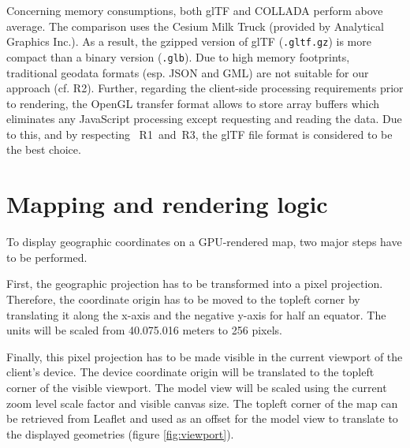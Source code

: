       Concerning memory consumptions, both glTF and COLLADA perform above average. The
      comparison uses the Cesium Milk Truck (provided by Analytical Graphics Inc.). As
      a result, the gzipped version of glTF (\texttt{.gltf.gz}) is more compact than a
      binary version (\texttt{.glb}). Due to high memory footprints, traditional
      geodata formats (esp. JSON and GML) are not suitable for our approach (cf. R2). Further,
      regarding the client-side processing requirements prior to rendering, the OpenGL
      transfer format allows to store array buffers which eliminates any JavaScript
      processing except requesting and reading the data. Due to this, and by respecting~
      R1~and~R3, the glTF file format is considered to be the best choice.

  \section{Mapping and rendering logic}
    To display geographic coordinates on a GPU-rendered map, two major steps have to be performed.\par
    First, the geographic projection has to be transformed into a pixel projection. Therefore, the coordinate origin has to be moved to the topleft corner by translating it along the x-axis and the negative y-axis for half an equator. The units will be scaled from 40.075.016 meters to 256 pixels.


    Finally, this pixel projection has to be made visible in the current viewport of the client's device. The device coordinate origin will be translated to the topleft corner of the visible viewport. The model view will be scaled using the current zoom level scale factor and visible canvas size.  The topleft corner of the map can be retrieved from Leaflet and used as an offset for the model view to translate to the displayed geometries (figure \ref{fig:viewport}).\par
